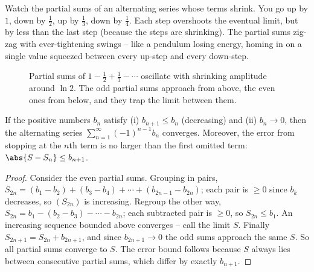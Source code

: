 \begin{intuitionbox}
Watch the partial sums of an alternating series whose terms shrink. You go up by $1$, down by $\tfrac12$, up by $\tfrac13$, down by $\tfrac14$. Each step overshoots the eventual limit, but by less than the last step (because the steps are shrinking). The partial sums zig-zag with ever-tightening swings -- like a pendulum losing energy, homing in on a single value squeezed between every up-step and every down-step.
\end{intuitionbox}

\begin{figure}[H]
\centering
{}
\caption{Partial sums of $1 - \tfrac12 + \tfrac13 - \cdots$ oscillate with shrinking amplitude around $\ln 2$. The odd partial sums approach from above, the even ones from below, and they trap the limit between them.}
\label{ch29:fig-alternating}
\end{figure}

\begin{theorem}
\label{ch29:thm-alternating}
If the positive numbers $b_n$ satisfy (i) $b_{n+1} \le b_n$ (decreasing) and (ii) $b_n \to 0$, then the alternating series $\sum_{n=1}^\infty (-1)^{n-1} b_n$ converges. Moreover, the error from stopping at the $n$th term is no larger than the first omitted term: $\abs{S - S_n} \le b_{n+1}$.
\end{theorem}

\begin{proof}
Consider the even partial sums. Grouping in pairs, $S_{2n} = (b_1 - b_2) + (b_3 - b_4) + \cdots + (b_{2n-1}-b_{2n})$; each pair is $\ge 0$ since $b_k$ decreases, so $(S_{2n})$ is increasing. Regroup the other way, $S_{2n} = b_1 - (b_2 - b_3) - \cdots - b_{2n}$; each subtracted pair is $\ge 0$, so $S_{2n} \le b_1$. An increasing sequence bounded above converges -- call the limit $S$. Finally $S_{2n+1} = S_{2n} + b_{2n+1}$, and since $b_{2n+1}\to 0$ the odd sums approach the same $S$. So all partial sums converge to $S$. The error bound follows because $S$ always lies between consecutive partial sums, which differ by exactly $b_{n+1}$.
\end{proof}

